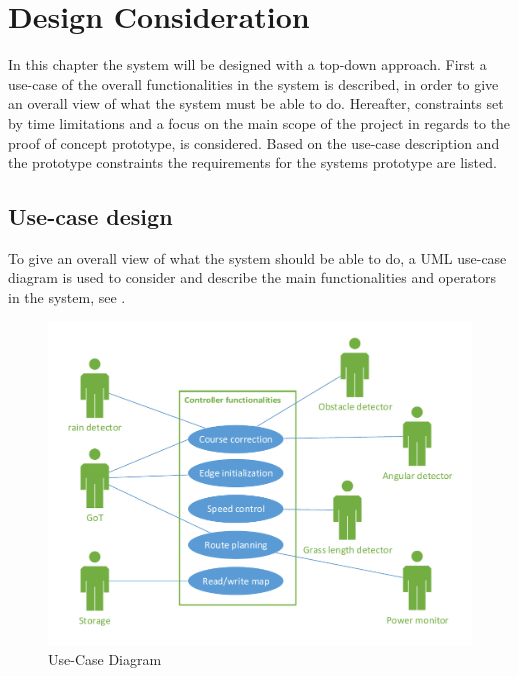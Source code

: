 \chapter{Design Consideration}
\vspace{-5 mm}
In this chapter the system will be designed with a top-down approach. First a use-case of the overall functionalities in the system is described, in order to give an overall view of what the system must be able to do. Hereafter, constraints set by time limitations and a focus on the main scope of the project in regards to the proof of concept prototype, is considered. Based on the use-case description and the prototype constraints the requirements for the systems prototype are listed.
\vspace{-4 mm}
\section{Use-case design}
To give an overall view of what the system should be able to do, a UML use-case diagram is used to consider and describe the main functionalities and operators in the system, see .
\vspace{-3 mm}
 \begin{figure}[H]
	\centering
	\includegraphics[scale=0.8]{figures/P5UseCase.pdf}
	\caption{Use-Case Diagram}
	\label{fig:usecase}
	\flushleft
\end{figure}

